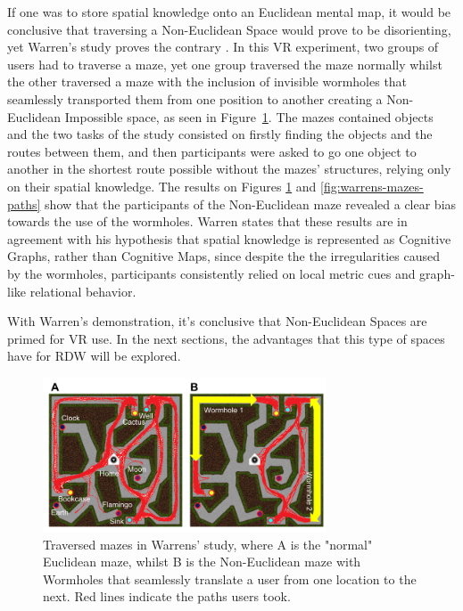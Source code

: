 If one was to store spatial knowledge onto an Euclidean mental map, it would be conclusive that traversing a Non-Euclidean Space would prove to be 
disorienting, yet Warren's study proves the contrary \cite{Warren2019}. In this \gls{VR} experiment, two groups of users had to traverse a maze, yet one group traversed the maze normally
whilst the other traversed a maze with the inclusion of invisible wormholes that seamlessly transported them from one position to another creating
a Non-Euclidean Impossible space, as seen in Figure~\ref{fig:warrens-mazes}. The mazes contained objects and the two tasks of the study  
consisted on firstly finding the objects and the routes between them, and then participants were asked to go one object to another in the shortest 
route possible without the mazes' structures, 
relying only on their spatial knowledge. The results on Figures \ref{fig:warrens-mazes} and \ref{fig:warrens-mazes-paths} show that 
the participants of the Non-Euclidean maze revealed a clear bias towards the use of the wormholes. Warren states that these results are in agreement 
with his hypothesis that spatial knowledge is represented as Cognitive Graphs, rather than Cognitive Maps, since despite the the irregularities 
caused by the wormholes, participants consistently relied on local metric cues and graph-like relational behavior. 

With Warren's demonstration, it's conclusive that Non-Euclidean Spaces are primed for \gls{VR} use. In the next sections, the advantages that this 
type of spaces have for \gls{RDW} will be explored.


\begin{figure}[p]
    \centering
    \includegraphics[width=0.75\textwidth]{NOVAthesisFiles/Images/papers/warrens-mazes.png}
    \caption{Traversed mazes in Warrens' study, where A is the "normal" Euclidean maze, whilst B is the Non-Euclidean maze with Wormholes that seamlessly
    translate a user from one location to the next. Red lines indicate the paths users took.  \cite{Warren2019}}
    \label{fig:warrens-mazes}
\end{figure}

